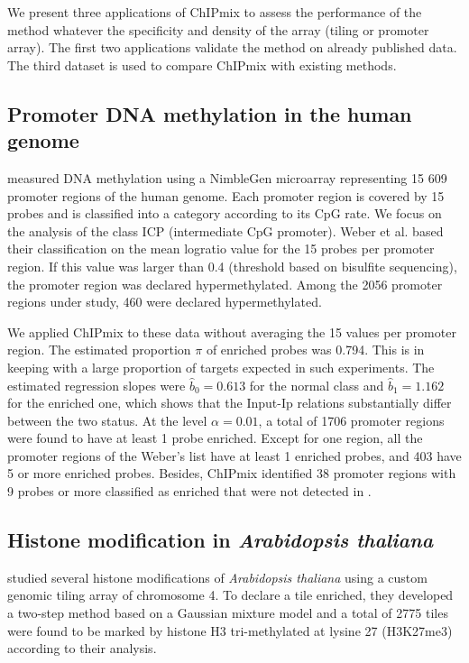 \documentclass{bioinfo}
\begin{document}
We present three applications of ChIPmix to assess the performance of the method whatever the specificity and density of the array (tiling or promoter array). The first two applications validate the method on already
published data. The third dataset is used to compare ChIPmix with existing methods.

\subsection{Promoter DNA methylation in the human genome}
\cite{Schubeler07} measured DNA methylation using a NimbleGen
microarray representing 15 609 promoter regions of the human genome.
Each promoter region is covered by 15 probes and is classified into
a category according to its CpG rate. We focus on the analysis of
the class ICP (intermediate CpG promoter). Weber et al. based their
classification on the mean logratio value for the 15 probes per
promoter region. If this value was larger than 0.4 (threshold based
on bisulfite sequencing), the promoter region was declared
hypermethylated. Among the 2056 promoter regions under study, 460
were declared hypermethylated. {\par} We applied ChIPmix to these
data without averaging the 15 values per promoter region. The
estimated proportion $\pi$ of enriched probes was 0.794. This is in
keeping with a large proportion of targets expected in such
experiments. The estimated regression slopes were
$\widehat{b}_0=0.613$ for the normal class and $\widehat{b}_1=1.162$
for the enriched one, which shows that the Input-Ip relations
substantially differ between the two status. At the level
$\alpha=0.01$, a total of 1706 promoter regions were found to have
at least 1 probe enriched. Except for one region, all the promoter
regions of the Weber's list have at least 1 enriched probes, and 403
have 5 or more enriched probes. Besides, ChIPmix identified 38
promoter regions with 9 probes or more classified as enriched that
were not detected in \cite{Schubeler07}.

\subsection{Histone modification in \textit{Arabidopsis thaliana}}
\cite{Turck07} studied several histone modifications of
\textit{Arabidopsis thaliana} using a custom genomic tiling array of
chromosome 4. To declare a tile enriched, they developed a two-step
method based on a Gaussian mixture model and a total of 2775 tiles
were found to be marked by histone H3 tri-methylated at lysine 27
(H3K27me3) according to their analysis.
\end{document}
